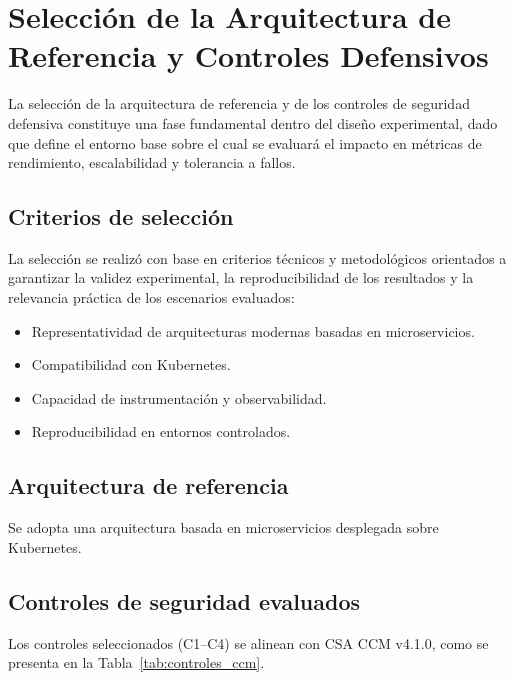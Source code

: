 \chapter{Selección de la Arquitectura de Referencia y Controles Defensivos}

La selección de la arquitectura de referencia y de los controles de seguridad defensiva constituye una fase fundamental dentro del diseño experimental, dado que define el entorno base sobre el cual se evaluará el impacto en métricas de rendimiento, escalabilidad y tolerancia a fallos.

\section{Criterios de selección}

La selección se realizó con base en criterios técnicos y metodológicos orientados a garantizar la validez experimental, la reproducibilidad de los resultados y la relevancia práctica de los escenarios evaluados:

\begin{itemize}[noitemsep]
    \item Representatividad de arquitecturas modernas basadas en microservicios.
    \item Compatibilidad con Kubernetes.
    \item Capacidad de instrumentación y observabilidad.
    \item Reproducibilidad en entornos controlados.
\end{itemize}

\section{Arquitectura de referencia}

Se adopta una arquitectura basada en microservicios desplegada sobre Kubernetes. 

\section{Controles de seguridad evaluados}

Los controles seleccionados (C1–C4) se alinean con CSA CCM v4.1.0, como se presenta en la Tabla~\ref{tab:controles_ccm}.

